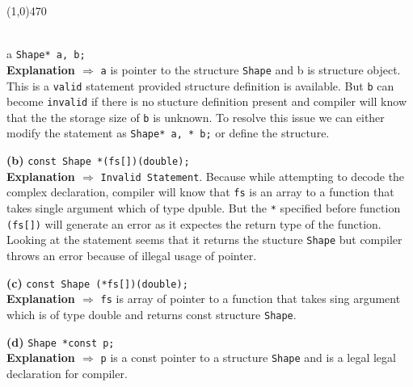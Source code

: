 \documentclass[12pt]{article}
\newcommand\question[3]{\vspace{.25in}{#1: #2}\vspace{.5em}\vspace{.10in}\\}
\renewcommand\part[1]{\vspace{.10in}\textbf{(#1)}}
\begin{document}
\begin{center}
\line(1,0){470}
\end{center}

\question{2}{Describe in English the types of the following variables. Identify any types which are invalid:}

\part{a} \texttt{Shape* a, b;} 
\\ 
\textbf{Explanation $\Rightarrow$} \texttt{a} is pointer to the structure \texttt{Shape} and b is structure object. This is a \texttt{valid} statement provided structure definition is available. But \texttt{b} can become \texttt{invalid} if there is no stucture definition present and compiler will know that the the storage size of \texttt{b} is unknown. To resolve this issue we can either modify the statement as \texttt{Shape* a, * b;} or define the structure.

\part{b} \texttt{const Shape *(fs[])(double);}
\\
\textbf{Explanation $\Rightarrow$} \texttt{Invalid Statement}. Because while attempting to decode the complex declaration, compiler will know that \texttt{fs} is an array to a function that takes   single argument which of type dpuble. But the \texttt{*} specified before function \texttt{(fs[])} will generate an error as it expectes the return type of the function. Looking at the statement seems that it returns the stucture \texttt{Shape} but compiler throws an error because of illegal usage of pointer.

\part{c} \texttt{const Shape (*fs[])(double);}
\\
\textbf{Explanation $\Rightarrow$} \texttt{fs} is array of pointer to a function that takes sing argument which is of type double and returns const structure \texttt{Shape}. 

\part{d} \texttt{Shape *const p;} 
\\
\textbf{Explanation $\Rightarrow$} \texttt{p} is a const pointer to a structure \texttt{Shape} and is a legal legal declaration for compiler.
\end{document}
